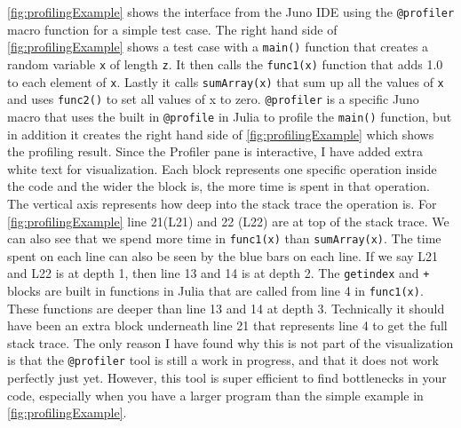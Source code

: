 \autoref{fig:profilingExample} shows the interface from the Juno IDE using the \texttt{@profiler} macro function \emph{\citep{JunoProfilerMacro}} for a simple test case. The right hand side of \autoref{fig:profilingExample} shows a test case with a \texttt{main()} function that creates a random variable \texttt{x} of length \texttt{z}. It then  calls the \texttt{func1(x)} function that adds 1.0 to each element of \texttt{x}. Lastly it calls \texttt{sumArray(x)} that sum up all the values of \texttt{x} and uses \texttt{func2()} to set all values of x to zero. \texttt{@profiler} is a specific Juno macro that uses the built in \texttt{@profile} in Julia \emph{\citep{Profile.jl}} to profile the \texttt{main()} function, but in addition it creates the right hand side of \autoref{fig:profilingExample} which shows the profiling result. Since the Profiler pane is interactive, I have added extra white text for visualization. Each block represents one specific operation inside the code and the wider the block is, the more time is spent in that operation. The vertical axis represents how deep into the stack trace the operation is. For \autoref{fig:profilingExample} line 21(L21) and 22 (L22) are at top of the stack trace. We can also see that we spend more time in \texttt{func1(x)} than \texttt{sumArray(x)}. The time spent on each line can also be seen by the blue bars on each line. If we say  L21 and L22 is at depth 1, then line 13 and 14 is at depth 2. The \texttt{getindex} and \texttt{+} blocks are built in functions in Julia that are called from line 4 in \texttt{func1(x)}. These functions are deeper than line 13 and 14 at depth 3. Technically it should have been an extra block underneath line 21 that represents line 4 to get the full stack trace. The only reason I have found why this is not part of the visualization is that the \texttt{@profiler} tool is still a work in progress, and that it does not work perfectly just yet. However, this tool is super efficient to find bottlenecks in your code, especially when you have a larger program than the simple example in \autoref{fig:profilingExample}. 
